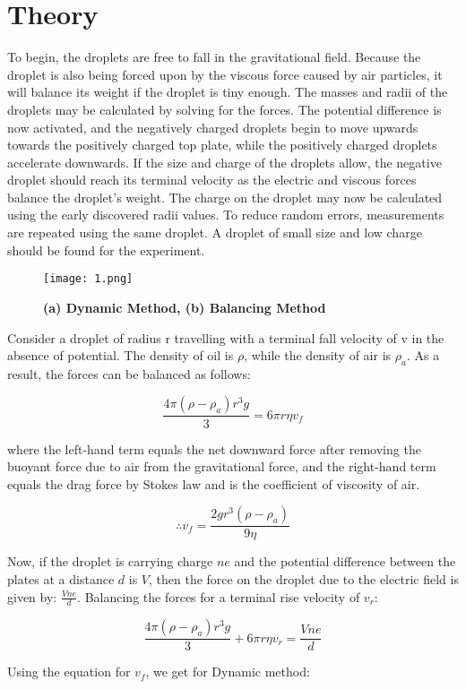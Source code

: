 \section{Theory}
	To begin, the droplets are free to fall in the gravitational field. Because the droplet is also being forced upon by the viscous force caused by air particles, it will balance its weight if the droplet is tiny enough. The masses and radii of the droplets may be calculated by solving for the forces. The potential difference is now activated, and the negatively charged droplets begin to move upwards towards the positively charged top plate, while the positively charged droplets accelerate downwards. If the size and charge of the droplets allow, the negative droplet should reach its terminal velocity as the electric and viscous forces balance the droplet's weight. The charge on the droplet may now be calculated using the early discovered radii values. To reduce random errors, measurements are repeated using the same droplet. A droplet of small size and low charge should be found for the experiment.

	\begin{figure}[H]
		\centering
		\texttt{[image: 1.png]}
		\caption{\textbf{(a) Dynamic Method, (b) Balancing Method}}
		\label{fig:1}
	\end{figure}

	Consider a droplet of radius r travelling with a terminal fall velocity of v in the absence of potential. The density of oil is $\rho$, while the density of air is $\rho_a$. As a result, the forces can be balanced as follows:

	$$\frac{4\pi(\rho-\rho_a)r^3g}{3} = 6\pi r\eta v_f$$

	where the left-hand term equals the net downward force after removing the buoyant force due to air from the gravitational force, and the right-hand term equals the drag force by Stokes law and is the coefficient of viscosity of air.

	$$\therefore v_f = \frac{2gr^3(\rho-\rho_a)}{9\eta}$$

	Now, if the droplet is carrying charge $ne$ and the potential difference between the plates at a distance $d$ is $V$, then the force on the droplet due to the electric field is given by: $\frac{Vne}{d}$. Balancing the forces for a terminal rise velocity of $v_r$:

	$$\frac{4\pi(\rho-\rho_a)r^3g}{3} + 6\pi r\eta v_r = \frac{Vne}{d}$$

	Using the equation for $v_f$, we get for Dynamic method:


